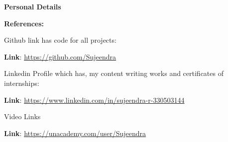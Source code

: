 \documentclass[12pt]{article}
\begin{document}
\vspace{\baselineskip}
{\fontsize{14pt}{16.8pt}\selectfont \textbf{Personal Details}\par}\par

\par

\par

\par

\par

\par

\vspace{\baselineskip}
{\fontsize{14pt}{16.8pt}\selectfont \textbf{References:}\par}\par

{\fontsize{13pt}{15.6pt}\selectfont Github link has code for all projects:\par}\par


	 {\fontsize{13pt}{15.6pt}\selectfont \textbf{Link}: \href{https://github.com/Sujeendra}{https://github.com/Sujeendra}\par}\par


\vspace{\baselineskip}
{\fontsize{13pt}{15.6pt}\selectfont Linkedin Profile which has, my content writing works and certificates of internships:\par}\par
	 {\fontsize{13pt}{15.6pt}\selectfont \textbf{Link}: \href{https://www.linkedin.com/in/sujeendra-r-330503144}{https://www.linkedin.com/in/sujeendra-r-330503144}\par}\par


\vspace{\baselineskip}
{\fontsize{13pt}{15.6pt}\selectfont Video Links\par}\par

	 {\fontsize{13pt}{15.6pt}\selectfont \textbf{Link}: \href{https://unacademy.com/user/Sujeendra}{https://unacademy.com/user/Sujeendra}\par}\par


\vspace{\baselineskip}
\end{document}
